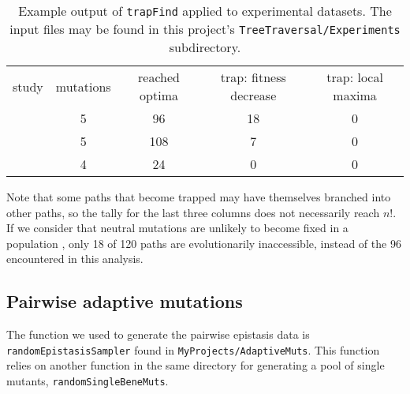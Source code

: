 \begin{table}
\centering
\begin{tabular}{ccccc}
study                 & mutations & reached optima & trap: fitness decrease & trap: local maxima \\
\citet{Weinreich2006} & 5         & 96             & 18                     & 0                  \\
\citet{Khan2011}      & 5         & 108            & 7                      & 0                  \\
\citet{Chou2011}      & 4         & 24             & 0                      & 0                  \\
\end{tabular}
\caption{Example output of \texttt{trapFind} applied to experimental
datasets. The input files may be found in this project's
\texttt{TreeTraversal/Experiments} subdirectory.}
\label{tab:threeAdaptEvoDats}
\end{table}

Note that some paths that become trapped may have themselves branched
into other paths, so the tally for the last three columns does not
necessarily reach $n!$. If we consider that neutral mutations are
unlikely to become fixed in a population \citep{Weinreich2006}, only
18 of 120 paths are evolutionarily inaccessible, instead of the 96
encountered in this analysis.

\subsection{Pairwise adaptive mutations}

The function we used to generate the pairwise
epistasis data is \texttt{randomEpistasisSampler} found in 
\texttt{MyProjects/AdaptiveMuts}. This function relies on another
function in the same directory for generating a pool of single
mutants, \texttt{randomSingleBeneMuts}.

